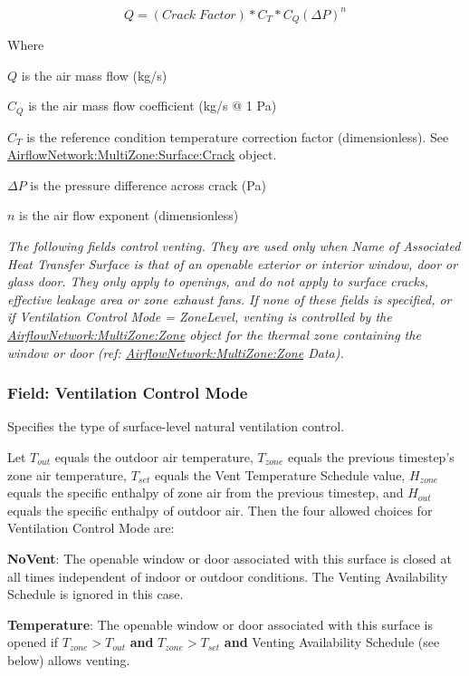 \begin{equation}
Q = \left( Crack\;Factor \right) * C_T * C_Q \left( \Delta P \right)^{n}
\end{equation}

Where

$Q$ is the air mass flow (kg/s)

$C_Q$ is the air mass flow coefficient (kg/s @ 1 Pa)

$C_T$ is the reference condition temperature correction factor (dimensionless). See \hyperref[airflownetworkmultizonesurfacecrack]{AirflowNetwork:MultiZone:Surface:Crack} object.

$\Delta P$ is the pressure difference across crack (Pa)

$n$ is the air flow exponent (dimensionless)

\emph{The following fields control venting. They are used only when Name of Associated Heat Transfer Surface is that of an openable exterior or interior window, door or glass door. They only apply to openings, and do not apply to surface cracks, effective leakage area or zone exhaust fans. If none of these fields is specified, or if Ventilation Control Mode = ZoneLevel, venting is controlled by the \hyperref[airflownetworkmultizonezone]{AirflowNetwork:MultiZone:Zone} object for the thermal zone containing the window or door (ref: \hyperref[airflownetworkmultizonezone]{AirflowNetwork:MultiZone:Zone} Data).}

\subsubsection{Field: Ventilation Control Mode}\label{field-ventilation-control-mode-1}

Specifies the type of surface-level natural ventilation control.

Let $T_{out}$ equals the outdoor air temperature, $T_{zone}$ equals the previous
timestep's zone air temperature, $T_{set}$ equals the Vent Temperature Schedule
value, $H_{zone}$ equals the specific enthalpy of zone air from the previous
timestep, and $H_{out}$ equals the specific enthalpy of outdoor air. Then the
four allowed choices for Ventilation Control Mode are:

\textbf{NoVent}: The openable window or door associated with this surface is
closed at all times independent of indoor or outdoor conditions. The
Venting Availability Schedule is ignored in this case.

\textbf{Temperature}: The openable window or door associated with this surface
is opened if $T_{zone} > T_{out}$ \textbf{and} $T_{zone} > T_{set}$ \textbf{and}
Venting Availability Schedule (see below) allows venting.

